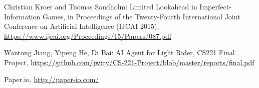 \documentclass{article}
\begin{document}
  

\begin{thebibliography}{1}

 Christian Kroer and Tuomas Sandholm: Limited Lookahead in Imperfect-Information Games, in Proceedings of the Twenty-Fourth International Joint Conference on Artificial Intelligence (IJCAI 2015), \href{https://www.ijcai.org/Proceedings/15/Papers/087.pdf}{https://www.ijcai.org/Proceedings/15/Papers/087.pdf}

 Wantong Jiang, Yipeng He, Di Bai: AI Agent for Light Rider, CS221 Final Project, \href{https://github.com/jwtty/CS-221-Project/blob/master/reports/final.pdf}{https://github.com/jwtty/CS-221-Project/blob/master/reports/final.pdf}

 Paper.io, \href{http://paper-io.com/}{http://paper-io.com/}


\end{thebibliography}
\end{document}
